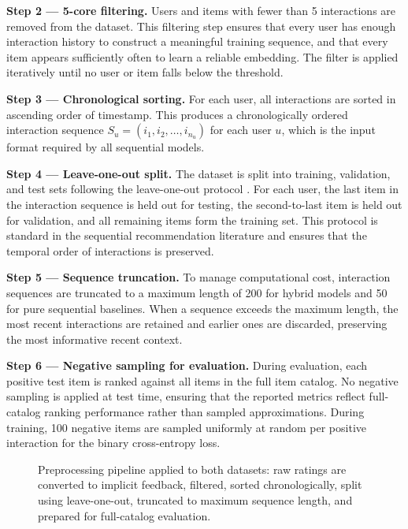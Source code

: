 \documentclass[12pt,a4paper]{report}
\begin{document}
\textbf{Step 2 — 5-core filtering.}
Users and items with fewer than 5 interactions are removed from the dataset.
This filtering step ensures that every user has enough interaction history to
construct a meaningful training sequence, and that every item appears
sufficiently often to learn a reliable embedding. The filter is applied
iteratively until no user or item falls below the threshold.

\textbf{Step 3 — Chronological sorting.}
For each user, all interactions are sorted in ascending order of timestamp.
This produces a chronologically ordered interaction sequence
\(S_u = (i_1, i_2, \ldots, i_{n_u})\) for each user \(u\), which is the
input format required by all sequential models.

\textbf{Step 4 — Leave-one-out split.}
The dataset is split into training, validation, and test sets following the
leave-one-out protocol \citep{kang2018sasrec}. For each user, the last item
in the interaction sequence is held out for testing, the second-to-last item
is held out for validation, and all remaining items form the training set.
This protocol is standard in the sequential recommendation literature and
ensures that the temporal order of interactions is preserved.

\textbf{Step 5 — Sequence truncation.}
To manage computational cost, interaction sequences are truncated to a maximum
length of 200 for hybrid models and 50 for pure sequential baselines. When a
sequence exceeds the maximum length, the most recent interactions are retained
and earlier ones are discarded, preserving the most informative recent context.

\textbf{Step 6 — Negative sampling for evaluation.}
During evaluation, each positive test item is ranked against all items in the
full item catalog. No negative sampling is applied at test time, ensuring that
the reported metrics reflect full-catalog ranking performance rather than
sampled approximations. During training, 100 negative items are sampled
uniformly at random per positive interaction for the binary cross-entropy loss.

\begin{figure}[h]
    \centering
    \caption{Preprocessing pipeline applied to both datasets: raw ratings are
    converted to implicit feedback, filtered, sorted chronologically, split
    using leave-one-out, truncated to maximum sequence length, and prepared
    for full-catalog evaluation.}
    \label{fig:preprocessing}
\end{figure}
\end{document}
